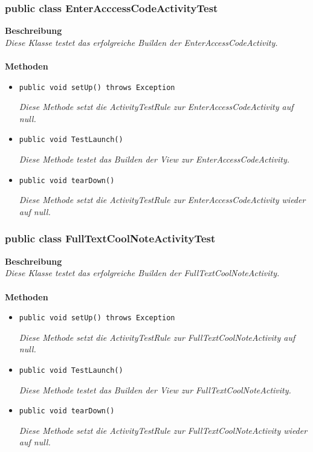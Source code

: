 \documentclass[a4paper]{scrreprt}
\begin{document}
	\subsubsection{public class EnterAcccessCodeActivityTest}
	\textbf{Beschreibung}\\
	\textit{Diese Klasse testet das erfolgreiche Builden der EnterAccessCodeActivity.}\\
	\\	
	\textbf{Methoden}
	\begin{itemize}
		
		\item\texttt{{public void setUp() throws Exception}}
		
		\textit{Diese Methode setzt die ActivityTestRule zur EnterAccessCodeActivity auf null.}
		
		\item\texttt{{public void TestLaunch()}}
		
		\textit{Diese Methode testet das Builden der View zur EnterAccessCodeActivity.}
		
		\item\texttt{{public void tearDown()}}
		
		\textit{Diese Methode setzt die ActivityTestRule zur EnterAccessCodeActivity wieder auf null.}
		
		
	\end{itemize}
	\subsubsection{public class FullTextCoolNoteActivityTest}
	\textbf{Beschreibung}\\
	\textit{Diese Klasse testet das erfolgreiche Builden der FullTextCoolNoteActivity.}\\
	\\	
	\textbf{Methoden}
	\begin{itemize}
		
		\item\texttt{{public void setUp() throws Exception}}
		
		\textit{Diese Methode setzt die ActivityTestRule zur FullTextCoolNoteActivity auf null.}
		
		\item\texttt{{public void TestLaunch()}}
		
		\textit{Diese Methode testet das Builden der View zur FullTextCoolNoteActivity.}
		
		\item\texttt{{public void tearDown()}}
		
		\textit{Diese Methode setzt die ActivityTestRule zur FullTextCoolNoteActivity wieder auf null.}
		
		
	\end{itemize}
\end{document}
